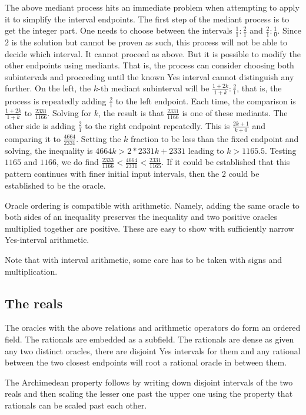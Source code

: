 \documentclass[12pt]{article}
\theoremstyle{remark}
\begin{document}
The above mediant process hits an immediate problem when attempting to apply it to simplify the interval endpoints. The first step of the mediant process is to get the integer part. One needs to choose between the intervals $\frac{1}{1}:\frac{2}{1}$ and $\frac{2}{1}:\frac{1}{0}$. Since $2$ is the solution but cannot be proven as such, this process will not be able to decide which interval. It cannot proceed as above. But it is possible to modify the other endpoints using mediants. That is, the process can consider choosing both subintervals and proceeding until the known Yes interval cannot distinguish any further. On the left, the $k$-th mediant subinterval will be $\frac{1 + 2k}{1+k}:\frac{2}{1}$, that is, the process is repeatedly adding $\frac{2}{1}$ to the left endpoint. Each time, the comparison is $\frac{1+2k}{1+k}$ to $\frac{2331}{1166}$. Solving for $k$, the result is that $\frac{2331}{1166}$ is one of these mediants. The other side is adding $\frac{2}{1}$ to the right endpoint repeatedly. This is $\frac{2k + 1}{k+0}$ and comparing it to $\frac{4664}{2331}$. Setting the $k$ fraction to be less than the fixed endpoint and solving, the inequality is $4664k > 2*2331 k + 2331$ leading to $k > 1165.5$. Testing $1165$ and $1166$, we do find $\frac{2333}{1166} < \frac{4664}{2331} < \frac{2331}{1165}$. If it could be established that this pattern continues with finer initial input intervals, then the 2 could be established to be the oracle. 

Oracle ordering is compatible with arithmetic. Namely, adding the same oracle to both sides of an inequality preserves the inequality and two positive oracles multiplied together are positive. These are easy to show with sufficiently narrow Yes-interval arithmetic. 

Note that with interval arithmetic, some care has to be taken with signs and multiplication. 

\subsection{The reals}

The oracles with the above relations and arithmetic operators do form an ordered field. The rationals are embedded as a subfield. The rationals are dense as given any two distinct oracles, there are disjoint Yes intervals for them and any rational between the two closest endpoints will root a rational oracle in between them. 

The Archimedean property follows by  writing down disjoint intervals of the two reals and then scaling the lesser one past the upper one using the property that rationals can be scaled past each other. 
\end{document}
